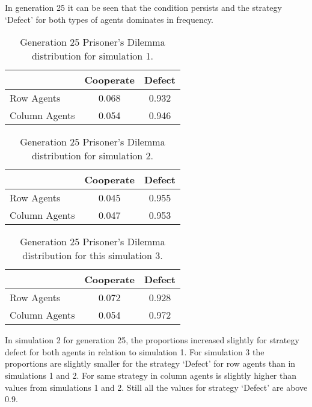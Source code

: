 In generation 25 it can be seen that the condition persists and the strategy `Defect' for both types of agents dominates in frequency.
\begin{table}[H]
\begin{center}
\begin{tabular}{|l|c|c|}
\hline
& Cooperate & Defect \\ 
\hline
Row Agents & 0.068 & 0.932\\
\hline
Column Agents & 0.054 & 0.946\\
\hline
\end{tabular}
\end{center}
\caption{Generation 25 Prisoner’s Dilemma distribution for simulation 1.}
\label{tab:pds1g25}
\end{table}

\begin{table}[H]
\begin{center}
\begin{tabular}{|l|c|c|}
\hline
& Cooperate & Defect \\ 
\hline
Row Agents & 0.045 & 0.955\\
\hline
Column Agents & 0.047 & 0.953\\
\hline
\end{tabular}
\end{center}
\caption{Generation 25 Prisoner’s Dilemma distribution for simulation 2.}
\label{tab:pds2g25}
\end{table}

\begin{table}[H]
\begin{center}
\begin{tabular}{|l|c|c|}
\hline
& Cooperate & Defect \\ 
\hline
Row Agents & 0.072 & 0.928\\
\hline
Column Agents & 0.054 & 0.972\\
\hline
\end{tabular}
\end{center}
\caption{Generation 25 Prisoner’s Dilemma distribution for this simulation 3.}
\label{tab:pds3g25}
\end{table}


In simulation 2 for generation 25, the proportions increased slightly for strategy defect for both agents in relation to simulation 1. For simulation 3 the proportions are slightly smaller for the strategy `Defect' for row agents than in simulations 1 and 2. For same strategy in column agents is slightly higher than values from simulations 1 and 2. Still all the values for strategy `Defect' are above 0.9.

